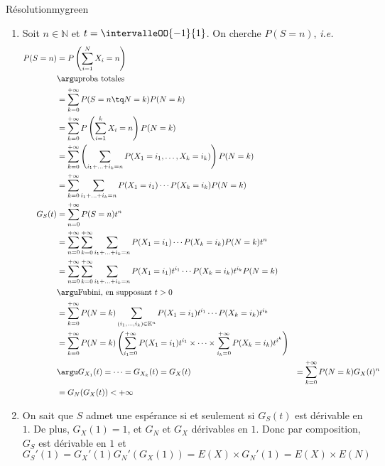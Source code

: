     \begin{demo}{Résolution}{mygreen}
        \begin{enumerate}[label = (\alph*)]
            \item Soit $n \in \mathbb{N}$ et $t = \intervalleOO{-1}{1}$. On cherche $P (S = n)$, \textit{i.e.} 
            \begin{align*}
                P(S = n) 
                &= P\left(\sum_{i=1}^{N} X_i = n\right) \\
                &\argu \text{proba totales} \\
                &= \sum_{k=0}^{+\infty} P(S = n \tq N = k) P(N = k) \\
                &= \sum_{k=0}^{+\infty} P\left(\sum_{i=1}^{k} X_i = n\right) P(N=k) \\
                &= \sum_{k=0}^{+\infty} \left(\sum_{i_1 + \ldots + i_k = n} P(X_1 = i_1,\ldots,X_k = i_k)\right) P(N = k) \\
                &= \sum_{k=0}^{+\infty} \sum_{i_1 + \ldots + i_k = n} P(X_1 = i_1) \cdots P(X_k = i_k) P(N = k) \\
                G_S(t) 
                &= \sum_{n=0}^{+\infty} P(S = n) t^n \\
                &= \sum_{n=0}^{+\infty} \sum_{k=0}^{+\infty} \sum_{i_1 + \ldots + i_k = n} P(X_1 = i_1) \cdots P(X_k = i_k) P(N = k) t^n \\
                &= \sum_{n=0}^{+\infty} \sum_{k=0}^{+\infty} \sum_{i_1 + \ldots + i_k = n} P(X_1 = i_1)t^{i_1} \cdots P(X_k = i_k) t^{i_k} P(N = k) \\
                &\argu \text{Fubini, en supposant } t > 0 \\
                &= \sum_{k=0}^{+\infty} P(N = k) \sum_{(i_1,\ldots,i_k) \in \mathbb{K}^n} P(X_1 = i_1)t^{i_1} \cdots P(X_k = i_k) t^{i_k} \\ 
                &= \sum_{k=0}^{+\infty} P(N = k) \left(\sum_{i_1 = 0}^{+\infty} P(X_1 = i_1) t^{i_1} \times \cdots \times \sum_{i_k = 0}^{+\infty} P(X_k = i_k) t^{i^k}\right) \\
                &\argu G_{X_1}(t) = \cdots = G_{X_k}(t) = G_X(t)
                &= \sum_{k=0}^{+\infty} P(N = k) G_X(t)^n \\
                &= G_N(G_X(t)) < +\infty 
            \end{align*}
            \item On sait que $S$ admet une espérance si et seulement si $G_S(t)$ est dérivable en $1$. De plus, $G_X(1) = 1$, et $G_N$ et $G_X$ dérivables en $1$. Donc par composition, $G_S$ est dérivable en $1$ et 
            \[ G_S'(1) = G_X'(1) G_N'(G_X(1)) = E(X) \times G_N'(1) = E(X) \times E(N) \]   
        \end{enumerate}
    \end{demo}

